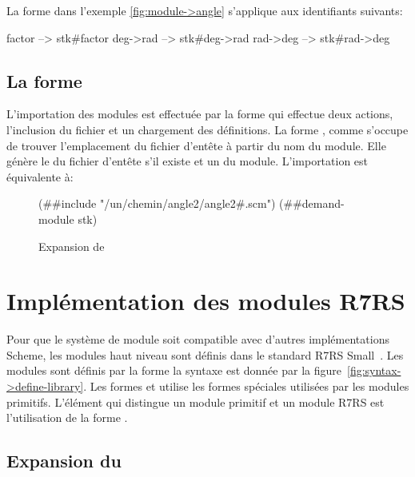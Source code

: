 La forme  dans l'exemple \ref{fig:module->angle}
s'applique aux identifiants suivants:
\begin{center}
  \begin{mplisting}{0.3}
factor    --> stk#factor
deg->rad  --> stk#deg->rad
rad->deg  --> stk#rad->deg
\end{mplisting}
\end{center}

\subsection{La forme }
%
L'importation des modules est effectuée par la forme  qui
effectue deux actions, l'inclusion du fichier  et un
chargement des définitions.  La forme , comme
 s'occupe de trouver l'emplacement du fichier d'entête
à partir du nom du module. Elle génère le  du fichier
d'entête s'il existe et un  du module.  L'importation
 est équivalente à:\\
\begin{figure}[ht]
  \centering
  \begin{mplisting}{0.9}
(##include "/un/chemin/angle2/angle2#.scm")
(##demand-module stk)
\end{mplisting}
  \caption{Expansion de }
  \label{fig:prim-import->stk}
\end{figure}


\section{Implémentation des modules R7RS}
Pour que le système de module soit compatible avec d'autres implémentations
Scheme,  les modules haut niveau sont définis dans le standard R7RS
Small~\cite{Scheme:R7RS}. Les modules sont définis par la forme
 la syntaxe est donnée par la
figure~\ref{fig:syntax->define-library}. Les formes  et
 utilise les formes spéciales utilisées par les modules
primitifs. L'élément qui distingue un module primitif et un module R7RS
est l'utilisation de la forme .

\subsection{Expansion du }
\label{sec:import-expand}

